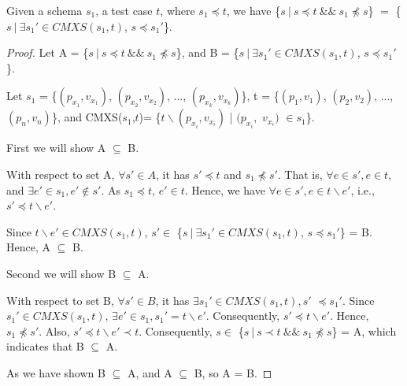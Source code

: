 \begin{proposition}\label{pro:subofCMXS}
Given a schema $s_{1}$, a test case $t$, where $s_{1} \preceq t$, we have \{$s\ |\ s \preceq t\ \&\&\ s_{1} \npreceq s$\} $=$  \{$ s\ |\ \exists s_{1}' \in CMXS(s_{1}, t)$, $s \preceq s_{1}'$\}.
\end{proposition}

\begin{proof}

Let A =  \{$s\ |\ s \preceq t\ \&\&\ s_{1} \npreceq s$\}, and B = \{$ s\ |\ \exists s_{1}' \in CMXS(s_{1}, t)$, $s \preceq s_{1}'$\}.



Let $s_{1}$ = \{$(p_{x_{1}}, v_{x_{1}})$, $(p_{x_{2}}, v_{x_{2}})$, ..., $(p_{x_{k}}, v_{x_{k}})$\},  t = \{$(p_{1}, v_{1})$, $(p_{2}, v_{2})$, ..., $(p_{n}, v_{n})$\}, and CMXS($s_{1}$,$t$)= \{$t \backslash (p_{x_{i}}, v_{x_{i}})$ | $(p_{x_{i}},$ $v_{x_{i}})$ $ \in s_{1} $\}.

First we will show A $\subseteq$ B.

With respect to set A, $\forall s' \in A$, it has $s' \preceq t$ and $ s_{1} \npreceq s'$. That is, $\forall e \in s', e \in t$, and  $\exists e' \in s_{1}, e' \not\in s'$. As $s_{1} \preceq t$, $e' \in t$. Hence, we have $\forall e \in s', e \in t \backslash e'$, i.e., $s' \preceq t \backslash e'$.

Since $t \backslash e' \in CMXS(s_{1}, t)$,  $s' \in $ \{$ s\ |\ \exists s_{1}' \in CMXS(s_{1}, t)$, $s \preceq s_{1}'$\} = B. Hence, A $\subseteq$ B.

Second we will show B $\subseteq$ A.

With respect to set B, $\forall s' \in B$, it has $\exists s_{1}' \in CMXS(s_{1}, t), s'$ $ \preceq s_{1}'$. Since $s_{1}' \in CMXS(s_{1}, t)$, $\exists e' \in s_{1}, s_{1}' =  t \backslash e'$. Consequently, $s' \preceq t \backslash e'$. Hence, $s_{1} \npreceq s'$. Also, $s' \preceq t \backslash e' \prec t$. Consequently, $s \in $  \{$s\ |\ s \prec t\ \&\&\ s_{1} \npreceq s$\} = A, which indicates that B $\subseteq$ A.

As we have shown B $\subseteq$ A, and A $\subseteq$ B, so A = B.

\end{proof}


